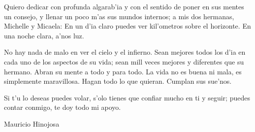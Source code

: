 
Quiero dedicar con profunda algarab'ia y con el sentido de poner en sus mentes un consejo, y llenar un poco m'as sus mundos internos; a mis dos hermanas, Michelle y Micaela: En un d'ia claro puedes ver kil'ometros sobre el horizonte. En una noche clara, a'nos luz.

No hay nada de malo en ver el cielo y el infierno. Sean mejores todos los d'ia en cada uno de los aspectos de su vida; sean mill veces mejores y diferentes que su hermano. Abran su mente a todo y para todo. La vida no es buena ni mala, es simplemente maravillosa. Hagan todo lo que quieran. Cumplan sus sue'nos. 

Si t'u lo deseas puedes volar, s'olo tienes que confiar mucho en ti y seguir; puedes contar conmigo, te doy todo mi apoyo. 

\vspace{2cm}
\begin{flushright}
Mauricio Hinojosa
\end{flushright}
